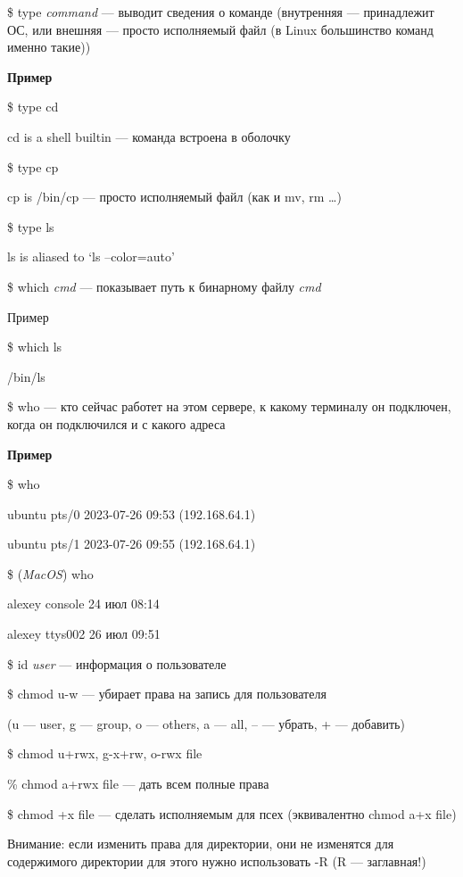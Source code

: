 \documentclass[oneside, final, 14pt]{extreport} %
\begin{document}
\$ type \textit{command} --- выводит сведения о команде (внутренняя --- принадлежит ОС,
или внешняя --- просто исполняемый файл (в Linux большинство команд именно такие))

\textbf{Пример}

\$ type cd 

cd is a shell builtin --- команда встроена в оболочку

\$ type cp

cp is /bin/cp --- просто исполняемый файл (как и mv, rm \dots)

\$ type ls

ls is aliased to `ls --color=auto'

\vspace{\baselineskip}

\$ which \textit{cmd} --- показывает путь к бинарному файлу \textit{cmd}

Пример

\$ which ls

/bin/ls

\vspace{\baselineskip}

\$ who --- кто сейчас работет на этом сервере, к какому терминалу он подключен, 
когда он подключился и с какого адреса

\textbf{Пример}

\$ who

ubuntu   pts/0        2023-07-26 09:53 (192.168.64.1)

ubuntu   pts/1        2023-07-26 09:55 (192.168.64.1)

\$ (\textit{MacOS}) who

alexey           console      24 июл 08:14 

alexey           ttys002      26 июл 09:51 

\vspace{\baselineskip}


\$ id \textit{user} --- информация о пользователе

\$ chmod u-w --- убирает права на запись для пользователя

(u --- user, g --- group, o --- others, a --- all, \--- --- убрать, + --- добавить)

\$ chmod u+rwx, g-x+rw, o-rwx file

\% chmod a+rwx file --- дать всем полные права

\$ chmod +x file --- сделать исполняемым для псех (эквивалентно chmod a+x file)

Внимание: если изменить права для директории, они не изменятся для содержимого директории
для этого нужно использовать \--R (R --- заглавная!)
\end{document}
